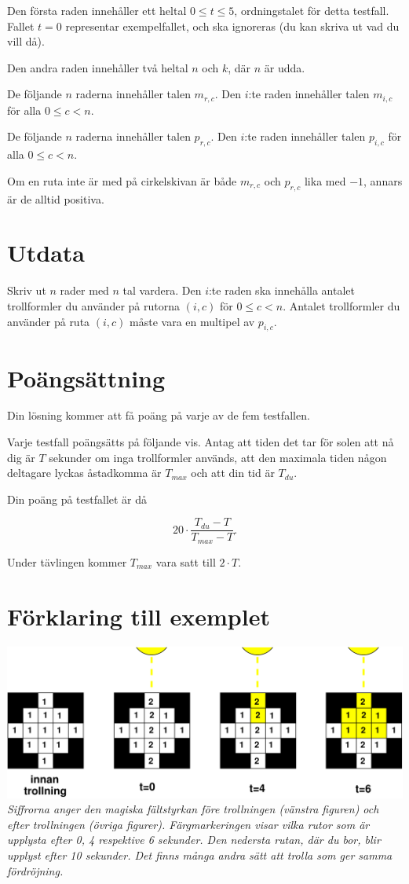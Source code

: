 Den första raden innehåller ett heltal $0 \le t \le 5$, ordningstalet för detta testfall.
Fallet $t = 0$ representar exempelfallet, och ska ignoreras (du kan skriva ut vad du vill då).

Den andra raden innehåller två heltal $n$ och $k$, där $n$ är udda.

De följande $n$ raderna innehåller talen $m_{r, c}$.
Den $i$:te raden innehåller talen $m_{i, c}$ för alla $0 \le c < n$.

De följande $n$ raderna innehåller talen $p_{r, c}$.
Den $i$:te raden innehåller talen $p_{i, c}$ för alla $0 \le c < n$.

Om en ruta inte är med på cirkelskivan är både $m_{r, c}$ och $p_{r, c}$ lika med $-1$, annars är de alltid positiva.

\section*{Utdata}
Skriv ut $n$ rader med $n$ tal vardera.
Den $i$:te raden ska innehålla antalet trollformler du använder på rutorna $(i, c)$ för $0 \le c < n$.
Antalet trollformler du använder på ruta $(i, c)$ måste vara en multipel av $p_{i, c}$.

\section*{Poängsättning}
Din lösning kommer att få poäng på varje av de fem testfallen.

Varje testfall poängsätts på följande vis.
Antag att tiden det tar för solen att nå dig är $T$ sekunder om inga trollformler används, att den maximala tiden någon deltagare lyckas åstadkomma är $T_{max}$ och att din tid är $T_{du}$.

Din poäng på testfallet är då

\[ 20 \cdot \frac{T_{du} - T}{T_{max} - T}. \]

Under tävlingen kommer $T_{max}$ vara satt till $2 \cdot T$.

\section*{Förklaring till exemplet}
\includegraphics[width=14cm]{disc.pdf}\\
{\em Siffrorna anger den magiska fältstyrkan före trollningen (vänstra figuren) och efter trollningen (övriga figurer). Färgmarkeringen visar vilka rutor som är upplysta efter 0, 4 respektive 6 sekunder. Den nedersta rutan, där du bor, blir upplyst efter 10 sekunder. Det finns många andra sätt att trolla som ger samma fördröjning.}


